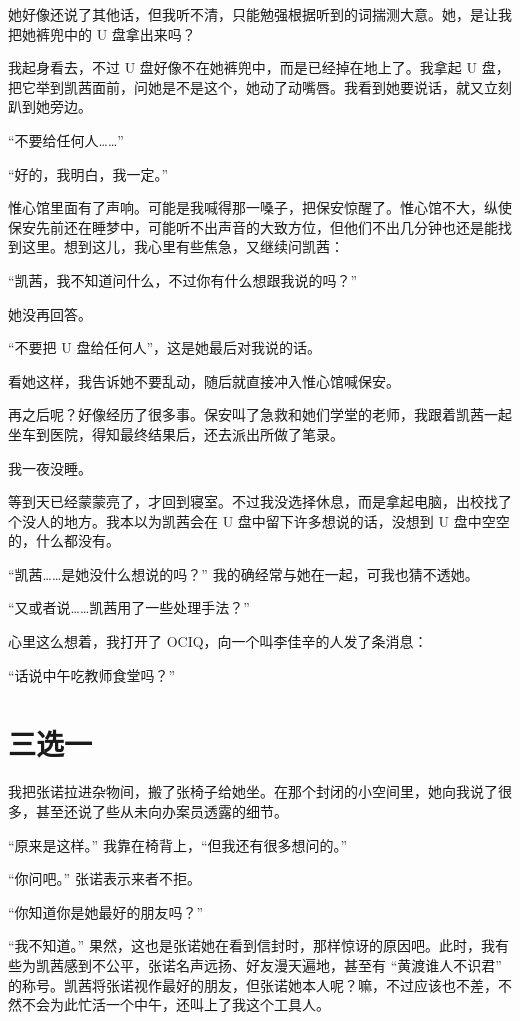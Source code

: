 \documentclass[UTF8]{ctexart}
\begin{document}
她好像还说了其他话，但我听不清，只能勉强根据听到的词揣测大意。她，是让我把她裤兜中的 U 盘拿出来吗？

我起身看去，不过 U 盘好像不在她裤兜中，而是已经掉在地上了。我拿起 U 盘，把它举到凯茜面前，问她是不是这个，她动了动嘴唇。我看到她要说话，就又立刻趴到她旁边。

“不要给任何人……”

“好的，我明白，我一定。”

惟心馆里面有了声响。可能是我喊得那一嗓子，把保安惊醒了。惟心馆不大，纵使保安先前还在睡梦中，可能听不出声音的大致方位，但他们不出几分钟也还是能找到这里。想到这儿，我心里有些焦急，又继续问凯茜：

“凯茜，我不知道问什么，不过你有什么想跟我说的吗？”

她没再回答。

“不要把 U 盘给任何人”，这是她最后对我说的话。

看她这样，我告诉她不要乱动，随后就直接冲入惟心馆喊保安。

再之后呢？好像经历了很多事。保安叫了急救和她们学堂的老师，我跟着凯茜一起坐车到医院，得知最终结果后，还去派出所做了笔录。

我一夜没睡。

等到天已经蒙蒙亮了，才回到寝室。不过我没选择休息，而是拿起电脑，出校找了个没人的地方。我本以为凯茜会在 U 盘中留下许多想说的话，没想到 U 盘中空空的，什么都没有。

“凯茜……是她没什么想说的吗？” 我的确经常与她在一起，可我也猜不透她。

“又或者说……凯茜用了一些处理手法？”

心里这么想着，我打开了 OCIQ，向一个叫李佳辛的人发了条消息：

“话说中午吃教师食堂吗？”

\section{三选一}

我把张诺拉进杂物间，搬了张椅子给她坐。在那个封闭的小空间里，她向我说了很多，甚至还说了些从未向办案员透露的细节。

“原来是这样。” 我靠在椅背上，“但我还有很多想问的。”

“你问吧。” 张诺表示来者不拒。

“你知道你是她最好的朋友吗？”

“我不知道。” 果然，这也是张诺她在看到信封时，那样惊讶的原因吧。此时，我有些为凯茜感到不公平，张诺名声远扬、好友漫天遍地，甚至有 “黄渡谁人不识君” 的称号。凯茜将张诺视作最好的朋友，但张诺她本人呢？嘛，不过应该也不差，不然不会为此忙活一个中午，还叫上了我这个工具人。
\end{document}
